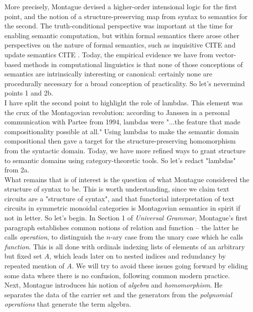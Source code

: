 More precisely, Montague devised a higher-order intensional logic for the first point, and the notion of a structure-preserving map from syntax to semantics for the second. The truth-conditional perspective was important at the time for enabling semantic computation, but within formal semantics there arose other perspectives on the nature of formal semantics, such as inquisitive \bR CITE \e and update semantics \bR CITE \e. Today, the empirical evidence we have from vector-based methods in computational linguistics is that none of those conceptions of semantics are intrinsically interesting or canonical: certainly none are procedurally necessary for a broad conception of practicality. So let's nevermind points 1 and 2b.\\

I have split the second point to highlight the role of lambdas. This element was the crux of the Montagovian revolution: according to Janssen in a personal communication with Partee from 1994, lambdas were "...the feature that made compositionality possible at all." Using lambdas to make the semantic domain compositional then gave a target for the structure-preserving homomorphism from the syntactic domain. Today, we have more refined ways to grant structure to semantic domains using category-theoretic tools. So let's redact "lambdas" from 2a.\\

What remains that is of interest is the question of what Montague considered the structure of syntax to be. This is worth understanding, since we claim text circuits are a "structure of syntax", and that functorial interpretation of text circuits in symmetric monoidal categories is Montagovian semantics in spirit if not in letter. So let's begin. In Section 1 of \emph{Universal Grammar}, Montague's first paragraph establishes common notions of relation and function -- the latter he calls \emph{operation}, to distinguish the $n$-ary case from the unary case which he calls \emph{function}. This is all done with ordinals indexing lists of elements of an arbitrary but fixed set $A$, which leads later on to nested indices and redundancy by repeated mention of $A$. We will try to avoid these issues going forward by eliding some data where there is no confusion, following common modern practice.\\

Next, Montague introduces his notion of \emph{algebra} and \emph{homomorphism}. He separates the data of the carrier set and the generators from the \emph{polynomial operations} that generate the term algebra.

